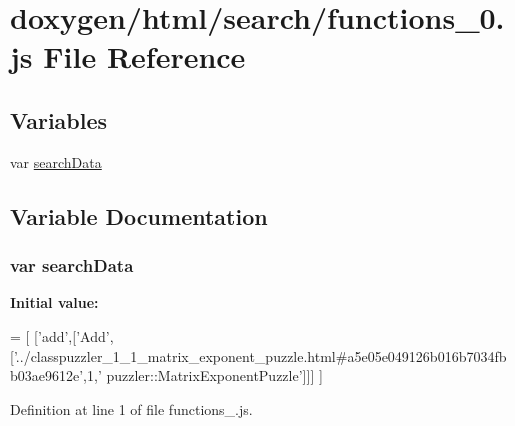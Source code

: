 \hypertarget{a00083}{}\section{doxygen/html/search/functions\+\_\+0.js File Reference}
\label{a00083}
\subsection*{Variables}
\begin{DoxyCompactItemize}
\item 
var \hyperlink{a00083_ad01a7523f103d6242ef9b0451861231e}{search\+Data}
\end{DoxyCompactItemize}


\subsection{Variable Documentation}
\hypertarget{a00083_ad01a7523f103d6242ef9b0451861231e}{}
\subsubsection[{search\+Data}]{\setlength{\rightskip}{0pt plus 5cm}var search\+Data}\label{a00083_ad01a7523f103d6242ef9b0451861231e}
{\bfseries Initial value\+:}
\begin{DoxyCode}
=
[
  [\textcolor{stringliteral}{'add'},[\textcolor{stringliteral}{'Add'},[\textcolor{stringliteral}{'../classpuzzler\_1\_1\_matrix\_exponent\_puzzle.html#a5e05e049126b016b7034fbb03ae9612e'},1,\textcolor{stringliteral}{'
      puzzler::MatrixExponentPuzzle'}]]]
]
\end{DoxyCode}


Definition at line 1 of file functions\+\_.\+js.


